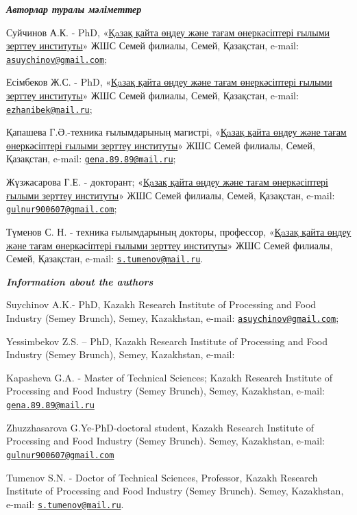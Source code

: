 \begin{authorinfo}
\emph{{\bfseries Авторлар туралы мәліметтер}}

Суйчинов А.К. - PhD, «\href{https://rpf.kz/?lang=kk}{Қaзақ қайта өңдеу
және тағам өнеркәсіптері ғылыми зерттеу институты}» ЖШС Семей филиалы,
Семей, Қазақстан, e-mail:
\href{mailto:asuychinov@gmail.com}{\nolinkurl{asuychinov@gmail.com}};

Есімбеков Ж.С. - PhD, «\href{https://rpf.kz/?lang=kk}{Қaзақ қайта өңдеу
және тағам өнеркәсіптері ғылыми зерттеу институты}» ЖШС Семей филиалы,
Семей, Қазақстан, e-mail:
\href{mailto:ezhanibek@mail.ru}{\nolinkurl{ezhanibek@mail.ru}};

Қапашева Г.Ә.-техника ғылымдарының магистрі,
«\href{https://rpf.kz/?lang=kk}{Қaзақ қайта өңдеу және тағам
өнеркәсіптері ғылыми зерттеу институты}» ЖШС Семей филиалы, Семей,
Қазақстан, e-mail:
\href{mailto:gena.89.89@mail.ru}{\nolinkurl{gena.89.89@mail.ru}};

Жүзжасарова Г.Е. - докторант; «\href{https://rpf.kz/?lang=kk}{Қaзақ
қайта өңдеу және тағам өнеркәсіптері ғылыми зерттеу институты}» ЖШС
Семей филиалы, Семей, Қазақстан, e-mail:
\href{mailto:gulnur900607@gmail.com}{\nolinkurl{gulnur900607@gmail.com}};

Түменов С. Н. - техника ғылымдарының докторы, профессор,
«\href{https://rpf.kz/?lang=kk}{Қaзақ қайта өңдеу және тағам
өнеркәсіптері ғылыми зерттеу институты}» ЖШС Семей филиалы, Семей,
Қазақстан, e-mail:
\href{mailto:s.tumenov@mail.ru}{\nolinkurl{s.tumenov@mail.ru}}.

\emph{{\bfseries Information about the authors}}

Suychinov A.K.- PhD, Kazakh Research Institute of Processing and Food
Industry (Semey Brunch), Semey, Kazakhstan, e-mail:
\href{mailto:asuychinov@gmail.com}{\nolinkurl{asuychinov@gmail.com}};

Yessimbekov Z.S. -- PhD, Kazakh Research Institute of Processing and
Food Industry (Semey Brunch), Semey, Kazakhstan,
e-mail:\href{mailto:ezhanibek@mail.ru}{}

Kapasheva G.A. - Master of Technical Sciences; Kazakh Research Institute
of Processing and Food Industry (Semey Brunch), Semey, Kazakhstan,
e-mail: \href{mailto:gena.89.89@mail.ru}{\nolinkurl{gena.89.89@mail.ru}}

Zhuzzhasarova G.Ye-PhD-doctoral student, Kazakh Research Institute of
Processing and Food Industry (Semey Brunch). Semey, Kazakhstan, e-mail:
\href{mailto:gulnur900607@gmail.com}{\nolinkurl{gulnur900607@gmail.com}}

Tumenov S.N. - Doctor of Technical Sciences, Professor, Kazakh Research
Institute of Processing and Food Industry (Semey Brunch). Semey,
Kazakhstan, e-mail:
\href{mailto:s.tumenov@mail.ru}{\nolinkurl{s.tumenov@mail.ru}}.\
\end{authorinfo}
